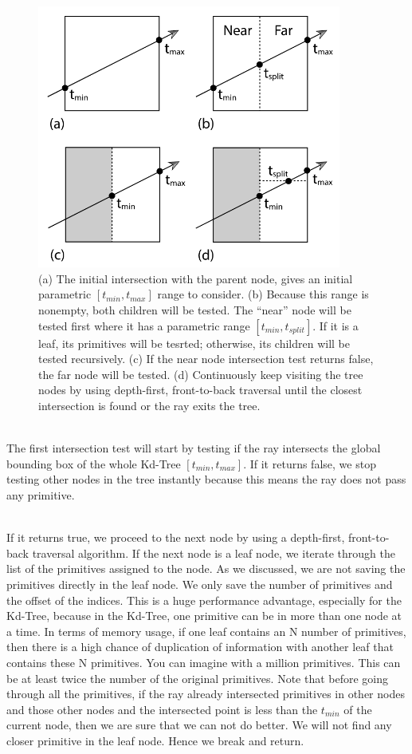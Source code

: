 \documentclass[11pt,a4paper]{article}
\begin{document}
\begin{figure}[H]	
     \centering
     \captionsetup{justification=centering,margin=2cm}
     \includegraphics[width=10cm]{images/kdtree/traversal.png}
     \caption{(a) The initial intersection with the parent node, gives an initial parametric $[t_{min}, t_{max}]$ range to consider. (b) Because this range is nonempty, both children will be tested. The “near” node will be tested first where it has a parametric range $[t_{min}, t_{split}]$. If it is a leaf, its primitives will be tesrted; otherwise, its children will be tested recursively. (c) If the near node intersection test returns false, the far node will be tested. (d) Continuously keep visiting the tree nodes by using depth-first, front-to-back traversal until the closest intersection is found or the ray exits the tree. \protect\cite{Pharr2016}}
        \label{fig:dice}
\end{figure}

\noindent
\\
The first intersection test will start by testing if the ray intersects the global bounding box of the whole Kd-Tree $[t_{min}, t_{max}]$. If it returns false, we stop testing other nodes in the tree instantly because this means the ray does not pass any primitive.

\noindent
\\
If it returns true, we proceed to the next node by using a depth-first, front-to-back traversal algorithm. If the next node is a leaf node, we iterate through the list of the primitives assigned to the node. As we discussed, we are not saving the primitives directly in the leaf node. We only save the number of primitives and the offset of the indices. This is a huge performance advantage, especially for the Kd-Tree, because in the Kd-Tree, one primitive can be in more than one node at a time. In terms of memory usage, if one leaf contains an N number of primitives, then there is a high chance of duplication of information with another leaf that contains these N primitives. You can imagine with a million primitives. This can be at least twice the number of the original primitives. Note that before going through all the primitives, if the ray already intersected primitives in other nodes and those other nodes and the intersected point is less than the $t_{min}$ of the current node, then we are sure that we can not do better. We will not find any closer primitive in the leaf node. Hence we break and return. 
 
\end{document}
